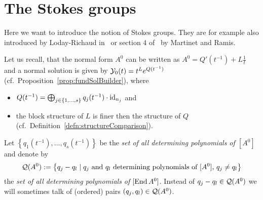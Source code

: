 \section{The Stokes groups}\label{sec:StokesGroup}
Here we want to introduce the notion of Stokes groups. They are for example
also introduced by Loday-Richaud in~\cite{Loday1994,Loday2014} or section 4
of~\cite{Martinet1991} by Martinet and Ramis.

Let us recall, that the normal form $A^0$ can be written as
$A^0=Q'(t^{-1})+L\frac{1}{t}$ and a normal solution is given by
$\mathcal{Y}_0(t)=t^Le^{Q(t^{-1})}$ (cf.\ Proposition~\ref{prop:fundSolBuilder}), where
\begin{itemize}
\item $Q(t^{-1})=\bigoplus_{j\in\{1,\dots,s\}}q_j(t^{-1})\cdot\operatorname{id}_{n_j}$ and
\item the block structure of $L$ is finer then the structure of $Q$
  (cf.\ Definition~\ref{defn:structureComparison}).
\end{itemize}
Let $\left\{q_1(t^{-1}),\dots,q_s(t^{-1})\right\}$ be the \emph{set of all
determining polynomials of $[A^0]$} and denote by
\[
  \mathcal{Q}(A^0):=\left\{q_j-q_l
    \mid
    \text{$q_j$ and $q_l$ determining polynomials of $[A^0]$, } q_j \neq q_l
  \right\}
\]
the \emph{set of all determining polynomials of $[\operatorname{End} A^0]$}.
Instead of $q_j-q_l\in\mathcal{Q}(A^0)$ we will sometimes talk of (ordered) pairs
$(q_j,q_l)\in\mathcal{Q}(A^0)$.


